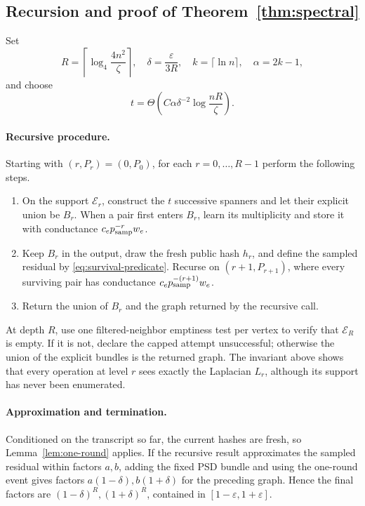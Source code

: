 \documentclass[11pt]{article}
\theoremstyle{definition}
\newcommand{\eps}{\varepsilon}
\begin{document}
\subsection{Recursion and proof of Theorem~\ref{thm:spectral}}

Set
\[
 R=\left\lceil\log_4\frac{4n^2}{\zeta}\right\rceil,
 \quad
 \delta=\frac{\eps}{3R},
 \quad
 k=\lceil\ln n\rceil,
 \quad
 \alpha=2k-1,
\]
and choose
\[
 t=\Theta\!\left(C\alpha\delta^{-2}
                  \log\frac{nR}{\zeta}\right).
\]

\paragraph{Recursive procedure.}
Starting with $(r,P_r)=(0,P_0)$, for each
$r=0,\ldots,R-1$ perform the following steps.
\begin{enumerate}[label=(\arabic*)]
\item On the support $\mathcal E_r$, construct the $t$ successive spanners
      and let their explicit union be $B_r$.  When a pair first enters
      $B_r$, learn its multiplicity and store it with conductance
      $c_ep_{\rm samp}^{-r}w_e$.
\item Keep $B_r$ in the output, draw the fresh public hash $h_r$, and define
      the sampled residual by \eqref{eq:survival-predicate}.  Recurse on
      $(r+1,P_{r+1})$, where every surviving pair has conductance
      $c_ep_{\rm samp}^{-(r+1)}w_e$.
\item Return the union of $B_r$ and the graph returned by the recursive call.
\end{enumerate}
At depth $R$, use one filtered-neighbor emptiness test per vertex to verify
that $\mathcal E_R$ is empty.  If it is not, declare the capped attempt
unsuccessful; otherwise the union of the explicit bundles is the returned
graph.  The invariant above shows that every operation at level $r$ sees
exactly the Laplacian $L_r$, although its support has never been enumerated.

\paragraph{Approximation and termination.}
Conditioned on the transcript so far, the current hashes are
fresh, so Lemma~\ref{lem:one-round} applies.  If the recursive result
approximates the sampled residual within factors $a,b$, adding the fixed PSD
bundle and using the one-round event gives factors
$a(1-\delta),b(1+\delta)$ for the preceding graph.  Hence the final factors
are $(1-\delta)^R,(1+\delta)^R$, contained in
$[1-\eps,1+\eps]$.
\end{document}
